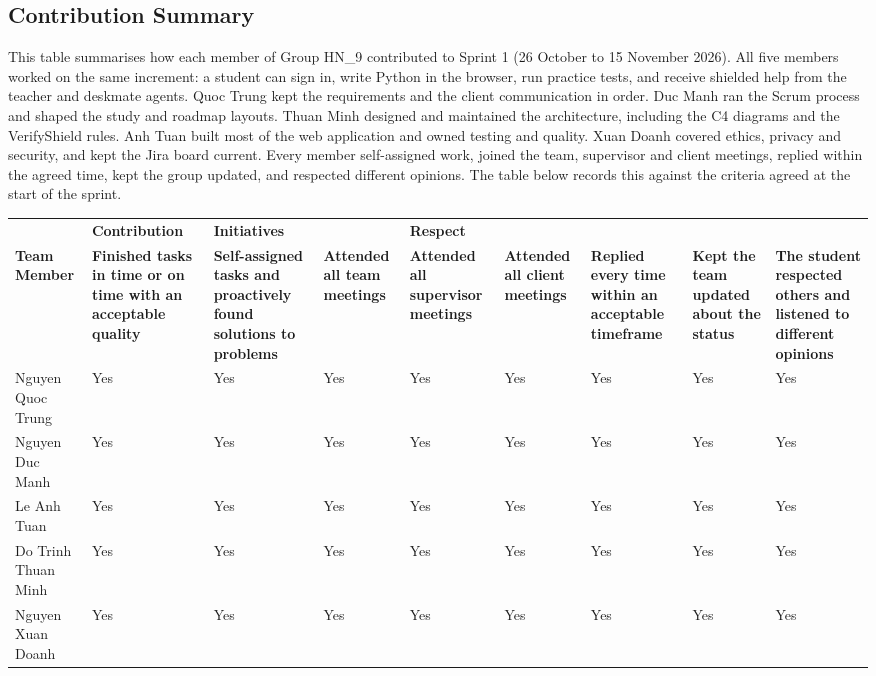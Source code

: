 \documentclass[11pt,a4paper]{article}
\begin{document}
\subsection*{Contribution Summary}
This table summarises how each member of Group HN\_9 contributed to Sprint 1 (26 October to 15 November 2026). All five members worked on the same increment: a student can sign in, write Python in the browser, run practice tests, and receive shielded help from the teacher and deskmate agents. Quoc Trung kept the requirements and the client communication in order. Duc Manh ran the Scrum process and shaped the study and roadmap layouts. Thuan Minh designed and maintained the architecture, including the C4 diagrams and the VerifyShield rules. Anh Tuan built most of the web application and owned testing and quality. Xuan Doanh covered ethics, privacy and security, and kept the Jira board current. Every member self-assigned work, joined the team, supervisor and client meetings, replied within the agreed time, kept the group updated, and respected different opinions. The table below records this against the criteria agreed at the start of the sprint.

{\footnotesize
\begin{longtable}{>{\raggedright\arraybackslash}p{}>{\raggedright\arraybackslash}p{}>{\raggedright\arraybackslash}p{}>{\raggedright\arraybackslash}p{}>{\raggedright\arraybackslash}p{}>{\raggedright\arraybackslash}p{}>{\raggedright\arraybackslash}p{}>{\raggedright\arraybackslash}p{}>{\raggedright\arraybackslash}p{}}
\toprule
 & \textbf{Contribution} & \textbf{Initiatives} & \multicolumn{5}{>{\centering\arraybackslash}p{\dimexpr 0.474\linewidth-2\tabcolsep\relax}}{\textbf{Communication}} & \textbf{Respect } \\
\textbf{Team Member} & \textbf{Finished tasks in time or on time with an acceptable quality} & \textbf{Self-assigned tasks and proactively found solutions to problems} & \textbf{Attended all team     meetings} & \textbf{Attended all supervisor meetings} & \textbf{Attended all client meetings} & \textbf{Replied every time within an acceptable timeframe} & \textbf{Kept the team updated about the status} & \textbf{The student respected others and listened to different opinions} \\
\midrule
\endhead
Nguyen Quoc Trung & Yes & Yes & Yes & Yes & Yes & Yes & Yes & Yes \\
Nguyen Duc Manh & Yes & Yes & Yes & Yes & Yes & Yes & Yes & Yes \\
Le Anh Tuan & Yes & Yes & Yes & Yes & Yes & Yes & Yes & Yes \\
Do Trinh Thuan Minh & Yes & Yes & Yes & Yes & Yes & Yes & Yes & Yes \\
Nguyen Xuan Doanh & Yes & Yes & Yes & Yes & Yes & Yes & Yes & Yes \\
\bottomrule
\end{longtable}}
\end{document}
